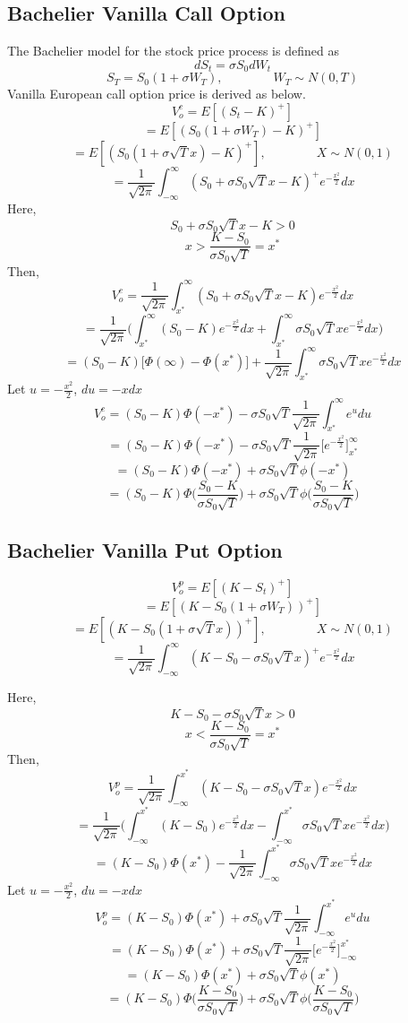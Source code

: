 \documentclass[fleqn,12pt]{SelfArx}
\begin{document}
\subsection{Bachelier Vanilla Call Option}
The Bachelier model for the stock price process is defined as
$$
dS_t = \sigma S_0dW_t
$$$$
S_T = S_0(1 + \sigma W_T), \qquad \qquad W_T\sim N(0, T)
$$
Vanilla European call option price is derived as below.
$$
V_o^{c} = {E}[(S_t-K)^{+}]
$$$$
= {E}[(S_0(1 + \sigma W_T)-K)^{+}]
$$$$
= {E}[(S_0(1 + \sigma \sqrt{T}x)-K)^{+}],\qquad \qquad X\sim N(0, 1)
$$$$
= \frac{1}{\sqrt{2\pi}}\int_{-\infty}^{\infty}(S_0 + \sigma S_0\sqrt{T}x-K)^{+}e^{-\frac{x^{2}}{2}}dx
$$
Here,
$$
S_0 + \sigma S_0\sqrt{T}x -K>0
$$$$
x > \frac{K-S_0}{\sigma S_0\sqrt{T}} = x^{*}
$$
Then,
$$
V_o^{c} = \frac{1}{\sqrt{2\pi}}\int_{x^{*}}^{\infty}(S_0 + \sigma S_0\sqrt{T}x-K)e^{-\frac{x^{2}}{2}}dx
$$$$
= \frac{1}{\sqrt{2\pi}}\Bigg(\int_{x^{*}}^{\infty}(S_0-K)e^{-\frac{x^{2}}{2}}dx +  \int_{x^{*}}^{\infty} \sigma S_0\sqrt{T}xe^{-\frac{x^{2}}{2}}dx\Bigg)
$$$$
= (S_0-K)\Big[\Phi(\infty)-\Phi(x^{*})\Big] + \frac{1}{\sqrt{2\pi}}\int_{x^{*}}^{\infty}\sigma S_0\sqrt{T}xe^{-\frac{x^{2}}{2}}dx
$$
Let $ u = -\frac{x^{2}}{2} $, $du = -xdx$
$$
V_o^{c}= (S_0-K)\Phi(-x^{*}) - \sigma S_0\sqrt{T}\frac{1}{\sqrt{2\pi}}\int_{x^{*}}^{\infty}e^{u}du
$$$$
= (S_0-K)\Phi(-x^{*}) - \sigma S_0\sqrt{T}\frac{1}{\sqrt{2\pi}}\big[e^{-\frac{x^{2}}{2}}\big]_{x^{*}}^\infty
$$$$
= (S_0-K)\Phi(-x^{*}) + \sigma S_0\sqrt{T}\phi(-x^{*})
$$
$$
= (S_0-K)\Phi\bigg(\frac{S_0-K}{\sigma S_0\sqrt{T}}\bigg) + \sigma S_0\sqrt{T}\phi\bigg(\frac{S_0-K}{\sigma S_0\sqrt{T}}\bigg)
$$

\subsection{Bachelier Vanilla Put Option}
$$
V_o^{p} = {E}[(K-S_t)^{+}]
$$$$
= {E}[(K-S_0(1 + \sigma W_T))^{+}]
$$$$
= {E}[(K-S_0(1 + \sigma \sqrt{T}x))^{+}],\qquad \qquad X\sim N(0, 1)
$$$$
= \frac{1}{\sqrt{2\pi}}\int_{-\infty}^{\infty}(K-S_0 - \sigma S_0\sqrt{T}x)^{+}e^{-\frac{x^{2}}{2}}dx
$$

Here,
$$
K - S_0 - \sigma S_0\sqrt{T}x >0
$$$$
x < \frac{K-S_0}{\sigma S_0\sqrt{T}} = x^{*}
$$
Then,
$$
V_o^{p} = \frac{1}{\sqrt{2\pi}}\int_{-\infty}^{x^{*}}(K-S_0 - \sigma S_0\sqrt{T}x)e^{-\frac{x^{2}}{2}}dx
$$$$
= \frac{1}{\sqrt{2\pi}}\Bigg(\int_{-\infty}^{x^{*}}(K-S_0)e^{-\frac{x^{2}}{2}}dx - \int_{-\infty}^{x^{*}}\sigma S_0\sqrt{T}xe^{-\frac{x^{2}}{2}}dx\Bigg)
$$$$
=(K-S_0)\Phi(x^{*}) - \frac{1}{\sqrt{2\pi}}\int_{-\infty}^{x^{*}}\sigma S_0\sqrt{T}xe^{-\frac{x^{2}}{2}}dx
$$
Let $ u = -\frac{x^{2}}{2} $, $du = -xdx$
$$
V_o^{p} =(K-S_0)\Phi(x^{*}) + \sigma S_0\sqrt{T}\frac{1}{\sqrt{2\pi}}\int_{-\infty}^{x^{*}}e^{u}du
$$$$
= (K-S_0)\Phi(x^{*}) + \sigma S_0\sqrt{T}\frac{1}{\sqrt{2\pi}}\bigg[e^{-\frac{x^{2}}{2}}\bigg]_{-\infty}^{x^{*}}
$$$$
= (K-S_0)\Phi(x^{*}) + \sigma S_0\sqrt{T}\phi(x^{*})
$$
$$
= (K-S_0)\Phi\bigg(\frac{K-S_0}{\sigma S_0\sqrt{T}}\bigg) + \sigma S_0\sqrt{T}\phi\bigg(\frac{K-S_0}{\sigma S_0\sqrt{T}}\bigg)
$$
\end{document}
